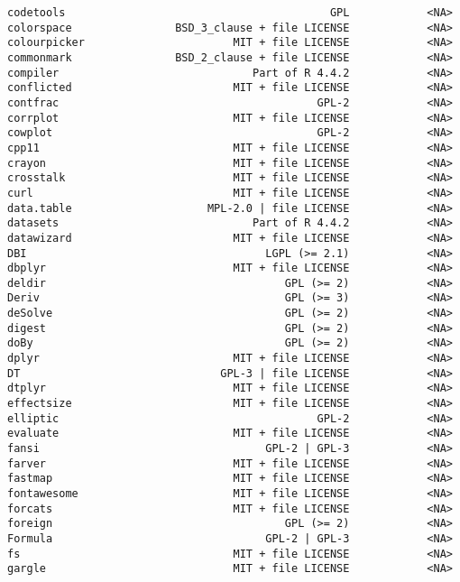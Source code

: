 \documentclass[
  letterpaper,
  DIV=11,
  numbers=noendperiod]{scrreprt}
\begin{document}
\begin{verbatim}
codetools                                         GPL            <NA>
colorspace                BSD_3_clause + file LICENSE            <NA>
colourpicker                       MIT + file LICENSE            <NA>
commonmark                BSD_2_clause + file LICENSE            <NA>
compiler                              Part of R 4.4.2            <NA>
conflicted                         MIT + file LICENSE            <NA>
contfrac                                        GPL-2            <NA>
corrplot                           MIT + file LICENSE            <NA>
cowplot                                         GPL-2            <NA>
cpp11                              MIT + file LICENSE            <NA>
crayon                             MIT + file LICENSE            <NA>
crosstalk                          MIT + file LICENSE            <NA>
curl                               MIT + file LICENSE            <NA>
data.table                     MPL-2.0 | file LICENSE            <NA>
datasets                              Part of R 4.4.2            <NA>
datawizard                         MIT + file LICENSE            <NA>
DBI                                     LGPL (>= 2.1)            <NA>
dbplyr                             MIT + file LICENSE            <NA>
deldir                                     GPL (>= 2)            <NA>
Deriv                                      GPL (>= 3)            <NA>
deSolve                                    GPL (>= 2)            <NA>
digest                                     GPL (>= 2)            <NA>
doBy                                       GPL (>= 2)            <NA>
dplyr                              MIT + file LICENSE            <NA>
DT                               GPL-3 | file LICENSE            <NA>
dtplyr                             MIT + file LICENSE            <NA>
effectsize                         MIT + file LICENSE            <NA>
elliptic                                        GPL-2            <NA>
evaluate                           MIT + file LICENSE            <NA>
fansi                                   GPL-2 | GPL-3            <NA>
farver                             MIT + file LICENSE            <NA>
fastmap                            MIT + file LICENSE            <NA>
fontawesome                        MIT + file LICENSE            <NA>
forcats                            MIT + file LICENSE            <NA>
foreign                                    GPL (>= 2)            <NA>
Formula                                 GPL-2 | GPL-3            <NA>
fs                                 MIT + file LICENSE            <NA>
gargle                             MIT + file LICENSE            <NA>

\end{verbatim}
\end{document}
